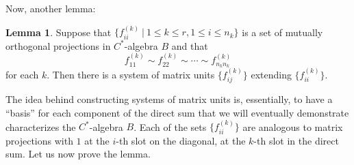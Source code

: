 \documentclass[aps,pra,showpacs,notitlepage,onecolumn,superscriptaddress,nofootinbib]{revtex4-1}
\theoremstyle{definition}
\newtheorem{lemma}{Lemma}[section]
\begin{document}
\noindent Now, another lemma:

\begin{lemma}
  Suppose that $\{f_{ii}^{(k)} \ | \ 1 \leq k \leq r, 1 \leq i \leq n_k\}$ is a set of mutually orthogonal projections in $C^{*}$-algebra $B$ and that
  \begin{equation}
    f_{11}^{(k)} \sim f_{22}^{(k)} \sim \cdots \sim f_{n_k n_k}^{(k)}
  \end{equation}
  for each $k$. Then there is a system of matrix units $\{f_{ij}^{(k)}\}$ extending $\{f_{ii}^{(k)}\}$.
\end{lemma}

\noindent The idea behind constructing systems of matrix units is, essentially, to have a ``basis'' for each component of the direct sum
that we will eventually demonstrate characterizes the $C^{*}$-algebra $B$. Each of the sets $\{f_{ii}^{(k)}\}$ are analogous to matrix projections
with $1$ at the $i$-th slot on the diagonal, at the $k$-th slot in the direct sum. Let us now prove the lemma.
\end{document}
